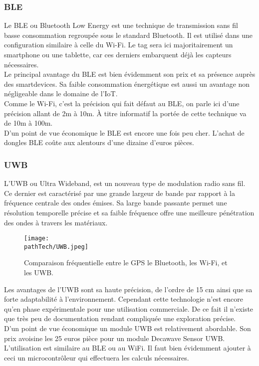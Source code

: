 \subsubsection{BLE}
Le BLE ou Bluetooth Low Energy est une technique de transmission sans fil basse consommation regroupée sous le standard Bluetooth.
Il est utilisé dans une configuration similaire à celle du Wi-Fi.
Le tag sera ici majoritairement un smartphone ou une tablette, car ces derniers embarquent déjà les capteurs nécessaires.
\\
Le principal avantage du BLE est bien évidemment son prix et sa présence auprès des smartdevices. Sa faible consommation énergétique est aussi un avantage non négligeable dans le domaine de l'IoT.
\medskip
\\
Comme le Wi-Fi, c'est la précision qui fait défaut au BLE, on parle ici d'une précision allant de 2m à 10m. À titre informatif la portée de cette technique va de 10m à 100m.
\medskip
\\
D'un point de vue économique le BLE est encore une fois peu cher. L'achat de dongles BLE coûte aux alentours d'une dizaine d'euros pièces.
\subsubsection{UWB}
L'UWB ou Ultra Wideband, est un nouveau type de modulation radio sans fil. Ce dernier est caractérisé par une grande largeur de bande par rapport à la fréquence centrale des ondes émises. Sa large bande passante permet une résolution temporelle précise et sa faible fréquence offre une meilleure pénétration des ondes à travers les matériaux.
\begin{figure}[H]
    \centering
    \texttt{[image: \\pathTech/UWB.jpeg]}
    \caption{Comparaison fréquentielle entre le GPS le Bluetooth, les Wi-Fi, et les UWB.}
\end{figure}

Les avantages de l'UWB sont sa haute précision, de l'ordre de 15 cm ainsi que sa forte adaptabilité à l'environnement. 
Cependant cette technologie n'est encore qu'en phase expérimentale pour une utilisation commerciale. De ce fait il n'existe que très peu de documentation rendant compliquée une exploration précise.
\\
D'un point de vue économique un module UWB est relativement abordable. Son prix avoisine les 25 euros pièce pour un module Decawave Sensor UWB.
L'utilisation est similaire au BLE ou au WiFi. Il faut bien évidemment ajouter à ceci un microcontrôleur qui effectuera les calculs nécessaires.


